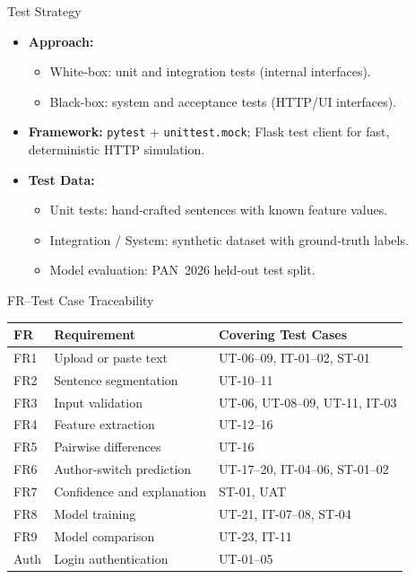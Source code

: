 \documentclass[compress,aspectratio=169]{beamer}
\begin{document}
\begin{frame}{Test Strategy}
    \begin{itemize}
        \item \textbf{Approach:}
        \begin{itemize}
            \item White‑box: unit and integration tests (internal interfaces).
            \item Black‑box: system and acceptance tests (HTTP/UI interfaces).
        \end{itemize}
        \item \textbf{Framework:} \texttt{pytest} + \texttt{unittest.mock}; Flask test client for fast, deterministic HTTP simulation.
        \item \textbf{Test Data:}
        \begin{itemize}
            \item Unit tests: hand‑crafted sentences with known feature values.
            \item Integration / System: synthetic dataset with ground‑truth labels.
            \item Model evaluation: PAN~2026 held‑out test split.
        \end{itemize}
    \end{itemize}
\end{frame}

\begin{frame}{FR–Test Case Traceability}
    \centering
    \footnotesize
    \begin{tabular}{p{0.8cm} p{5.5cm} p{5.0cm}}
    \toprule
    \textbf{FR} & \textbf{Requirement} & \textbf{Covering Test Cases}\\
    \midrule
    FR1 & Upload or paste text      & UT-06--09, IT-01--02, ST-01\\
    FR2 & Sentence segmentation     & UT-10--11\\
    FR3 & Input validation          & UT-06, UT-08--09, UT-11, IT-03\\
    FR4 & Feature extraction        & UT-12--16\\
    FR5 & Pairwise differences      & UT-16\\
    FR6 & Author-switch prediction  & UT-17--20, IT-04--06, ST-01--02\\
    FR7 & Confidence and explanation& ST-01, UAT\\
    FR8 & Model training            & UT-21, IT-07--08, ST-04\\
    FR9 & Model comparison          & UT-23, IT-11\\
    Auth & Login authentication      & UT-01--05\\
    \bottomrule
    \end{tabular}
\end{frame}
\end{document}
